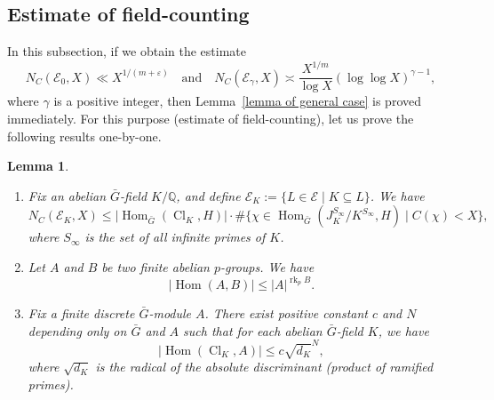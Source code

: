 \documentclass{amsart}
\numberwithin{equation}{section}
\theoremstyle{plain}
\newtheorem{lemma}[theorem]{Lemma}
\theoremstyle{definition}
\theoremstyle{remark}
\begin{document}
\subsection{Estimate of field-counting}
In this subsection, if we obtain the estimate
\begin{equation*}
	N_{C}(\mathcal{E}_0,X)\ll X^{1/(m+\varepsilon)}
	\quad\text{and}\quad
	N_{C}(\mathcal{E}_{\gamma},X)\asymp\frac{X^{1/m}}{\log X}(\log\log X)^{\gamma-1},
\end{equation*}
where $\gamma$ is a positive integer,
then Lemma~\ref{lemma of general case} is proved immediately.
For this purpose (estimate of field-counting), let us prove the following results one-by-one.
\begin{lemma}\label{lemma of the lemma}
	\begin{enumerate}
		\item Fix an abelian $\bar{G}$-field $K/\mathbb{Q}$, and define $\mathcal{E}_K:=\{L\in\mathcal{E}\mid K\subseteq L\}$.
		We have
		\begin{equation*}
			N_C(\mathcal{E}_K,X)\leq\lvert\operatorname{Hom}_{\bar{G}}(\operatorname{Cl}_K,H)\rvert\cdot\#\{\chi\in\operatorname{Hom}_{\bar{G}}(J_K^{S_{\infty}}/K^{S_{\infty}}, H)\mid C(\chi)<X\},
		\end{equation*}
		where $S_{\infty}$ is the set of all infinite primes of $K$.
		\item Let $A$ and $B$ be two finite abelian $p$-groups.
		We have
		\begin{equation*}
			\lvert \operatorname{Hom}(A,B)\rvert\leq\lvert A\rvert^{\operatorname{rk}_p B}.
		\end{equation*}
		\item Fix a finite discrete $\bar{G}$-module $A$.
		There exist positive constant $c$ and $N$ depending only on $\bar{G}$ and $A$ such that for each abelian $\bar{G}$-field $K$, we have
		\begin{equation}\label{eqn: lemma of the lemma 1}
			\lvert\operatorname{Hom}(\operatorname{Cl}_K,A)\rvert\leq c\sqrt{d_K}^{N},
		\end{equation}
		where $\sqrt{d_K}$ is the radical of the absolute discriminant (product of ramified primes).
	\end{enumerate}
\end{lemma}
\end{document}
